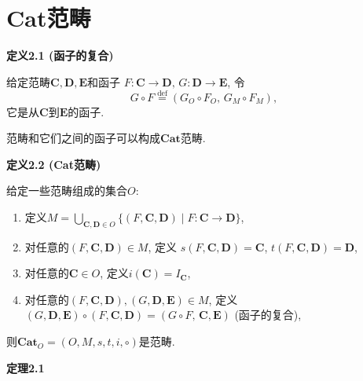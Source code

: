 \documentclass[UTF8]{ctexart}
\begin{document}
\newpage

\section{Cat范畴}




\hypertarget{sec:定义2.1}{}
\noindent\textbf{定义2.1 (函子的复合)}

给定范畴$\mathbf{C},\mathbf{D},\mathbf{E}$和函子
$F:\mathbf{C}\to\mathbf{D},\,G:\mathbf{D}\to\mathbf{E}$, 令
\[
    G\circ F\overset{\mathrm{def}}{=}(G_O\circ F_O,\,G_M\circ F_M),
\]
它是从$\mathbf{C}$到$\mathbf{E}$的函子.

\vspace{10pt}

范畴和它们之间的函子可以构成$\mathbf{Cat}$范畴.

\vspace{10pt}

\hypertarget{sec:定义2.2}{}
\noindent\textbf{定义2.2 (Cat范畴)}

给定一些范畴组成的集合$O$:
\begin{enumerate}
    \item 定义$\displaystyle M=\bigcup_{\mathbf{C},\mathbf{D}\in O}
    \{(F,\mathbf{C},\mathbf{D})\mid F:\mathbf{C}\to\mathbf{D}\}$,
    \vspace{3pt}
    \item 对任意的$(F,\mathbf{C},\mathbf{D})\in M$, 定义
    $s(F,\mathbf{C},\mathbf{D})=\mathbf{C}$,
    $t(F,\mathbf{C},\mathbf{D})=\mathbf{D}$,
    \item 对任意的$\mathbf{C}\in O$, 定义$i(\mathbf{C})=I_{\mathbf{C}}$,
    \item 对任意的$(F,\mathbf{C},\mathbf{D}),(G,\mathbf{D},\mathbf{E})\in M$,
    定义$(G,\mathbf{D},\mathbf{E})\circ(F,\mathbf{C},\mathbf{D})=
    (G\circ F,\,\mathbf{C},\mathbf{E})$ (函子的复合),
\end{enumerate}
则$\mathbf{Cat}_O=(O,M,s,t,i,\circ)$是范畴.


\vspace{10pt}

\hypertarget{sec:定理2.1}{}
\noindent\textbf{定理2.1}
\end{document}
